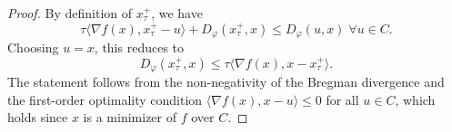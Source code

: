 \documentclass[10pt,a4paper]{amsart}
\newcommand{\df}{\nabla f}
\newcommand{\la}{\langle}
\newcommand{\ra}{\rangle}
\newcommand{\vphi}{\varphi}
\begin{document}
\begin{proof}
By definition of $x^+_\tau$, we have
\begin{equation}
    \tau \la \df(x), x^+_\tau - u \ra + D_\vphi(x^+_\tau, x) \leq  D_\vphi(u,x) \; \forall u \in C.
\end{equation}
Choosing $u = x$, this reduces to
\begin{equation}
    D_\vphi(x^+_\tau, x) \leq \tau \la \df(x), x - x^+_\tau \ra .
\end{equation}
The statement follows from the non-negativity of the Bregman divergence and the first-order optimality condition $\la \df(x), x - u \ra \leq 0$ for all $u \in C$, which holds since $x$ is a minimizer of $f$ over $C$.
\end{proof}
\end{document}
